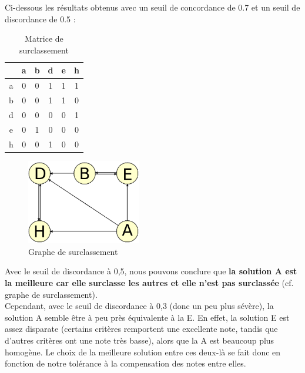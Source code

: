 \documentclass[paper=a4, fontsize=11pt]{report}
\numberwithin{equation}{section}		%
\numberwithin{figure}{section}			%
\numberwithin{table}{section}				%
\begin{document}
Ci-dessous les résultats obtenus avec un seuil de concordance de 0.7 et un seuil de discordance de 0.5 : 
\begin{multicols}{2}

\begin{table}[H]
\begin{center}
\begin{tabular}{c|ccccc}
 & a & b & d & e & h \\ 
\hline 
a & 0 & 0 & 1 & 1 & 1 \\ 
b & 0 & 0 & 1 & 1 & 0 \\ 
d & 0 & 0 & 0 & 0 & 1 \\ 
e & 0 & 1 & 0 & 0 & 0 \\ 
h & 0 & 0 & 1 & 0 & 0\\ 
\end{tabular} 
\caption{Matrice de surclassement} 
\end{center}
\end{table}
\begin{figure}[H]
\centering
\includegraphics[width=5cm]{figures/GraphDeSurClassement.png}
\caption{Graphe de surclassement}
\end{figure}
\end{multicols}

Avec le seuil de discordance à 0,5, nous pouvons conclure que \textbf{la solution A est la meilleure car elle surclasse les autres et elle n'est pas surclassée} (cf. graphe de surclassement).\\

Cependant, avec le seuil de discordance à 0,3 (donc un peu plus sévère), la solution A semble être à peu près équivalente à la E. En effet, la solution E est assez disparate (certains critères remportent une excellente note, tandis que d’autres critères ont une note très basse), alors que la A est beaucoup plus homogène. Le choix de la meilleure solution entre ces deux-là se fait donc en fonction de notre tolérance à la compensation des notes entre elles.
\end{document}
